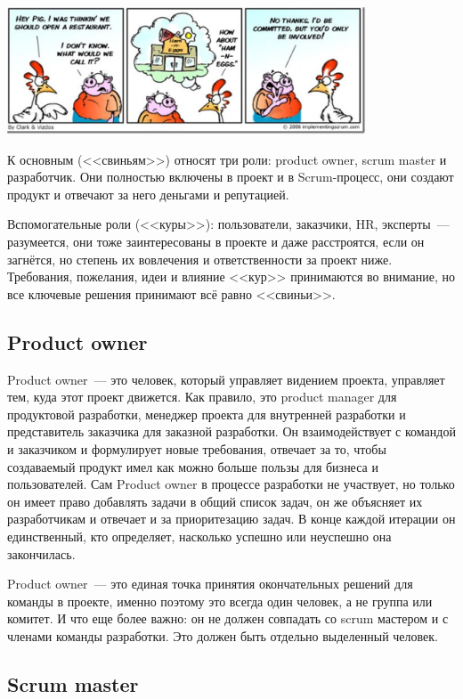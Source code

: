 \documentclass{../../text-style}
\begin{document}
\begin{center}
    \includegraphics[width=0.8\textwidth]{chickenAndPig.png}
\end{center}

К основным (<<свиньям>>) относят три роли: product owner, scrum master и разработчик. Они полностью включены в проект и в Scrum-процесс, они создают продукт и отвечают за него деньгами и репутацией.

Вспомогательные роли (<<куры>>): пользователи, заказчики, HR, эксперты~--- разумеется, они тоже заинтересованы в проекте и даже расстроятся, если он загнётся, но степень их вовлечения и ответственности за проект ниже. Требования, пожелания, идеи и влияние <<кур>> принимаются во внимание, но все ключевые решения принимают всё равно <<свиньи>>.

\subsection{Product owner}

Product owner~--- это человек, который управляет видением проекта, управляет тем, куда этот проект движется. Как правило, это product manager для продуктовой разработки, менеджер проекта для внутренней разработки и представитель заказчика для заказной разработки. Он взаимодействует с командой и заказчиком и формулирует новые требования, отвечает за то, чтобы создаваемый продукт имел как можно больше пользы для бизнеса и пользователей. Сам Product owner в процессе разработки не участвует, но только он имеет право добавлять задачи в общий список задач, он же объясняет их разработчикам и отвечает и за приоритезацию задач. В конце каждой итерации он единственный, кто определяет, насколько успешно или неуспешно она закончилась.

Product owner~--- это единая точка принятия окончательных решений для команды в проекте, именно поэтому это всегда один человек, а не группа или комитет. И что еще более важно: он не должен совпадать со scrum мастером и с членами команды разработки. Это должен быть отдельно выделенный человек.

\subsection{Scrum master}
\end{document}
